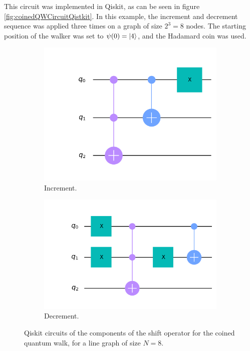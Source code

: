 \documentclass[../../dissertation.tex]{subfiles}
\begin{document}
This circuit was implemented in Qiskit, as can be seen in figure
\ref{fig:coinedQWCircuitQistkit}. In this example, the increment and decrement
sequence was applied three times on a graph of size $2^3 =8$ nodes. The
starting position of the walker was set to $\psi(0) = \ket{4}$, and the
Hadamard coin was used.
\begin{figure}[!h]
        \begin{subfigure}[h]{0.41\textwidth}
        \includegraphics[width=\linewidth]{img/Qiskit/CoinedQuantumWalk/Circuits/circIncr_N3_S3.png}
        \caption{Increment.}\label{fig:incQiskit}
        \end{subfigure}\hfill
        \begin{subfigure}[h]{0.50\textwidth}
        \includegraphics[width=\linewidth]{img/Qiskit/CoinedQuantumWalk/Circuits/circDecr_N3_S3.png}
        \caption{Decrement.}\label{fig:decQiskit}
        \end{subfigure}\hfill
        \caption{Qiskit circuits of the components of the shift operator for the coined quantum walk, for a line graph of size $N=8$.}
        \label{fig:qiskitShiftOperator}
\end{figure}\par
\end{document}
